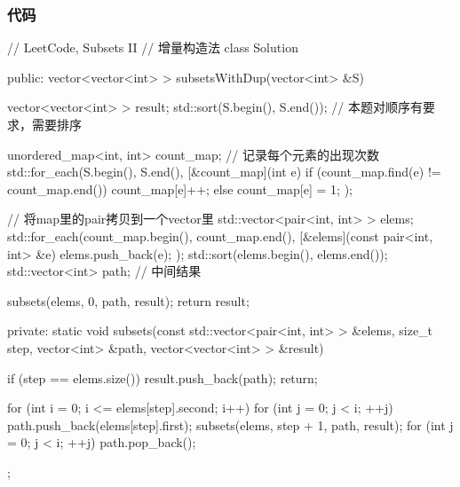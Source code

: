 \subsubsection{代码}
\begin{Code}
// LeetCode, Subsets II
// 增量构造法
class Solution {
public:
    vector<vector<int> > subsetsWithDup(vector<int> &S) {
        vector<vector<int> > result;
        std::sort(S.begin(), S.end()); // 本题对顺序有要求，需要排序

        unordered_map<int, int> count_map; // 记录每个元素的出现次数
        std::for_each(S.begin(), S.end(), [&count_map](int e) {
            if (count_map.find(e) != count_map.end())
                count_map[e]++;
            else
                count_map[e] = 1;
        });

        // 将map里的pair拷贝到一个vector里
        std::vector<pair<int, int> > elems;
        std::for_each(count_map.begin(), count_map.end(),
                [&elems](const pair<int, int> &e) {
                    elems.push_back(e);
                });
        std::sort(elems.begin(), elems.end());
        std::vector<int> path; // 中间结果

        subsets(elems, 0, path, result);
        return result;
    }

private:
    static void subsets(const std::vector<pair<int, int> > &elems,
            size_t step, vector<int> &path, vector<vector<int> > &result) {
        if (step == elems.size()) {
            result.push_back(path);
            return;
        }

        for (int i = 0; i <= elems[step].second; i++) {
            for (int j = 0; j < i; ++j) {
                path.push_back(elems[step].first);
            }
            subsets(elems, step + 1, path, result);
            for (int j = 0; j < i; ++j) {
                path.pop_back();
            }
        }
    }
};
\end{Code}

